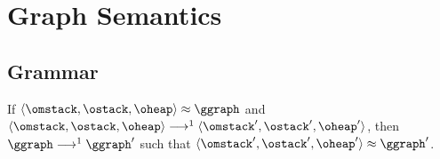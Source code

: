 \documentclass{article}
\begin{document}


    \section{Graph Semantics}

      \subsection{Grammar}

      \begin{grammar}
        \grule[graph]{\ggraph}{ \{\gedge, \ldots\} }
        \grule[edges]{\gedge}{
                    \gnode \gsBefore \gnode
            \gor    \gnode \gsSkip \gnode
        }
        \grule[nodes]{\gnode}{
                    \gsstart
            \gor    \gsend
            \gor    \gsLR{\olbl, \omstack, \gtime}
            \gor    \gsLR{\genter \olbl, \gtime}
            \gor    \gsLR{\gleave \olbl, \gtime}
        }

      \end{grammar}

      \begin{theorem}[Bisimulation]
        If $\osLR{\omstack, \ostack, \oheap} \approx \ggraph$ and $\osLR{\omstack, \ostack, \oheap} \osTransition \osLR{\omstack', \ostack', \oheap'}$, then $\ggraph \gsTransition \ggraph'$ such that $\osLR{\omstack', \ostack', \oheap'} \approx \ggraph'$.
      \end{theorem}
\end{document}
